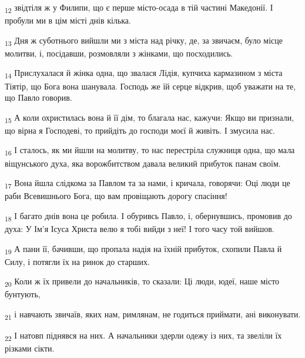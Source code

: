 \begin{tcolorbox}
\textsubscript{12} звідтіля ж у Филипи, що є перше місто-осада в тій частині Македонії. І пробули ми в цім місті днів кілька.
\end{tcolorbox}
\begin{tcolorbox}
\textsubscript{13} Дня ж суботнього вийшли ми з міста над річку, де, за звичаєм, було місце молитви, і, посідавши, розмовляли з жінками, що посходились.
\end{tcolorbox}
\begin{tcolorbox}
\textsubscript{14} Прислухалася й жінка одна, що звалася Лідія, купчиха кармазином з міста Тіятір, що Бога вона шанувала. Господь же їй серце відкрив, щоб уважати на те, що Павло говорив.
\end{tcolorbox}
\begin{tcolorbox}
\textsubscript{15} А коли охристилась вона й її дім, то благала нас, кажучи: Якщо ви признали, що вірна я Господеві, то прийдіть до господи моєї й живіть. І змусила нас.
\end{tcolorbox}
\begin{tcolorbox}
\textsubscript{16} І сталось, як ми йшли на молитву, то нас перестріла служниця одна, що мала віщунського духа, яка ворожбитством давала великий прибуток панам своїм.
\end{tcolorbox}
\begin{tcolorbox}
\textsubscript{17} Вона йшла слідкома за Павлом та за нами, і кричала, говорячи: Оці люди це раби Всевишнього Бога, що вам провіщають дорогу спасіння!
\end{tcolorbox}
\begin{tcolorbox}
\textsubscript{18} І багато днів вона це робила. І обуривсь Павло, і, обернувшись, промовив до духа: У Ім'я Ісуса Христа велю я тобі вийди з неї! І того часу той вийшов.
\end{tcolorbox}
\begin{tcolorbox}
\textsubscript{19} А пани її, бачивши, що пропала надія на їхній прибуток, схопили Павла й Силу, і потягли їх на ринок до старших.
\end{tcolorbox}
\begin{tcolorbox}
\textsubscript{20} Коли ж їх привели до начальників, то сказали: Ці люди, юдеї, наше місто бунтують,
\end{tcolorbox}
\begin{tcolorbox}
\textsubscript{21} і навчають звичаїв, яких нам, римлянам, не годиться приймати, ані виконувати.
\end{tcolorbox}
\begin{tcolorbox}
\textsubscript{22} І натовп піднявся на них. А начальники здерли одежу із них, та звеліли їх різками сікти.
\end{tcolorbox}

